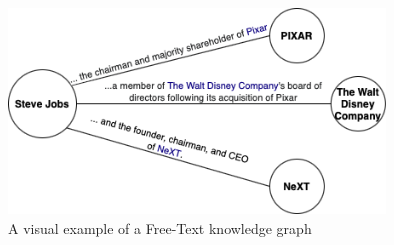 \begin{sloppypar}
\begin{figure}
    \centering
  \begin{minipage}[b]{0.7\textwidth}
    \includegraphics[width=10cm]{chapters/figures/KG1.jpg}
    \caption{A visual example of a Free-Text knowledge graph}
    \label{fig:ftkg}
    \end{minipage}
\end{figure}


\end{sloppypar}
